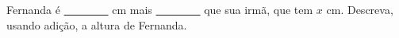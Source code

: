 \documentclass[a4paper,14pt]{article}
\begin{document}
\begin{multicols}{2}
\begin{enumerate}
\begin{enumerate}[a)]
    			Fernanda é \underline{~~~~~~~~} cm mais \underline{~~~~~~~~} que sua irmã, que tem $x$ cm. Descreva, usando adição, a altura de Fernanda.
    		\end{enumerate}
    	\end{enumerate}
    	$~$ \\ $~$ \\ $~$ \\ $~$ \\ $~$ \\ $~$ \\ $~$ \\ $~$ \\ $~$ \\ $~$ \\ $~$ \\ $~$ \\ $~$ \\ $~$ \\ $~$ \\ $~$ \\ $~$ \\ $~$ \\ $~$ \\ $~$ \\ $~$ \\ $~$ \\ $~$ \\ $~$ \\ $~$ \\ $~$ \\ $~$ \\ $~$ \\ $~$ \\ $~$ \\ $~$ \\ $~$ \\ $~$ \\ $~$ \\ $~$ \\ $~$ \\ $~$ \\ $~$ \\ $~$ \\ $~$ \\ $~$ \\ $~$ \\ $~$ \\ $~$ \\ $~$ \\ $~$ \\ $~$ \\ $~$ \\ $~$ \\ $~$ \\ $~$ \\ $~$ \\ $~$ \\ $~$ \\ $~$ \\ $~$ \\
	\end{multicols}
\end{document}
